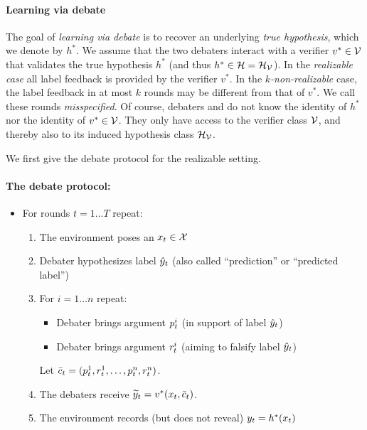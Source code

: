 \documentclass[anon]{alt2027} %
\begin{document}

\paragraph{Learning via debate} The goal of \emph{learning via debate} is to recover an underlying \emph{true hypothesis}, which we denote by $h^*$. We assume that the two debaters interact with a verifier $v^*\in{\mathcal V}$ that validates the true hypothesis $h^*$ (and thus $h^*\in{{\mathcal H}} = {{\mathcal H}}_{\mathcal V}$).
In the \emph{realizable case} all label feedback is provided by the verifier $v^*$.
In the \emph{$k$-non-realizable} case, the label feedback in at most $k$ rounds may be different from that of $v^*$. We call these rounds \emph{misspecified}. Of course, debaters \dt and \df do not know the identity of $h^*$ nor the identity of $v^*\in{\mathcal V}$. They only have access to the verifier class ${\mathcal V}$, and thereby also to its induced hypothesis class ${{\mathcal H}}_{\mathcal V}$.

We first give the debate protocol for the realizable setting. 
\paragraph{The debate protocol:}
\begin{itemize}
\item For rounds $t = 1\ldots T$ repeat:
\begin{enumerate}
 \item The environment poses an $x_t\in{\mathcal X}$
 \item Debater \dt hypothesizes label ${\hat{y}}_t$ (also called ``prediction'' or ``predicted label'')
 \item For $i = 1 \ldots n$ repeat:
 \begin{itemize}
  \item Debater \dt brings argument ${p}^i_t$ (in support of label ${\hat{y}}_t$)
  \item Debater \df brings argument ${r}^i_t$ (aiming to falsify label ${\hat{y}}_t$)
 \end{itemize}
Let $\bar{c}_t=({p}^1_t,{r}^1_t,\ldots,{p}^n_t,{r}^n_t)$.
 \item The debaters receive ${\widetilde{y}}_t=v^*(x_t,\bar{c}_t)$. 
 \item %
       The environment records (but does not reveal) $y_t = h^*(x_t)$ 
\end{enumerate}
\end{itemize}
\end{document}
